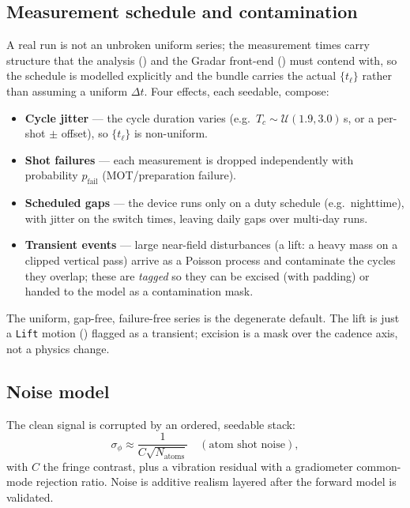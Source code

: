 \documentclass[11pt,a4paper]{article}
\theoremstyle{reqstyle}
\begin{document}
\subsection{Measurement schedule and contamination}
\label{sec:schedule}
A real run is not an unbroken uniform series; the measurement times carry structure that the
analysis () and the Gradar front-end () must contend with, so
the schedule is modelled explicitly and the bundle carries the actual $\{t_\ell\}$ rather than
assuming a uniform $\Delta t$. Four effects, each seedable, compose:
\begin{itemize}[leftmargin=*,nosep]
\item \textbf{Cycle jitter} --- the cycle duration varies (e.g.\ $T_c\sim\mathcal U(1.9,3.0)$\,s,
or a per-shot $\pm$ offset), so $\{t_\ell\}$ is non-uniform.
\item \textbf{Shot failures} --- each measurement is dropped independently with probability
$p_{\text{fail}}$ (MOT/preparation failure).
\item \textbf{Scheduled gaps} --- the device runs only on a duty schedule (e.g.\ nighttime),
with jitter on the switch times, leaving daily gaps over multi-day runs.
\item \textbf{Transient events} --- large near-field disturbances (a lift: a heavy mass on a
clipped vertical pass) arrive as a Poisson process and contaminate the cycles they overlap;
these are \emph{tagged} so they can be excised (with padding) or handed to the model as a
contamination mask.
\end{itemize}
The uniform, gap-free, failure-free series is the degenerate default. The lift is just a
\texttt{Lift} motion () flagged as a transient; excision is a mask over the
cadence axis, not a physics change.

\subsection{Noise model}
The clean signal is corrupted by an ordered, seedable stack:
\begin{equation}
\sigma_\phi \approx \frac{1}{C\sqrt{N_{\text{atoms}}}}\quad(\text{atom shot noise}),
\end{equation}
with $C$ the fringe contrast, plus a vibration residual with a gradiometer common-mode
rejection ratio. Noise is additive realism layered after the forward model is validated.
\end{document}
